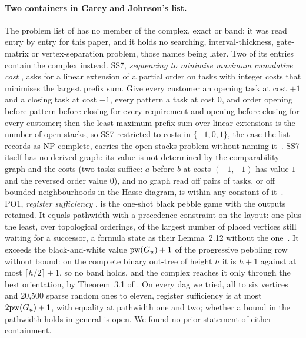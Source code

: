 \paragraph{Two containers in Garey and Johnson's list.} The problem list of
\citet{GareyJohnson1979} has no member of the complex, exact or band: it was
read entry by entry for this paper, and it holds no searching,
interval-thickness, gate-matrix or vertex-separation problem, those names
being later. Two of its entries contain the complex instead. SS7,
\emph{sequencing to minimise maximum cumulative cost}
\citep{AbdelWahab1976}, asks for a linear extension of a partial order on
tasks with integer costs that minimises the largest prefix sum. Give every
customer an opening task at cost $+1$ and a closing task at cost $-1$, every
pattern a task at cost $0$, and order opening before pattern before closing
for every requirement and opening before closing for every customer; then the
least maximum prefix sum over linear extensions is the number of open stacks,
so SS7 restricted to costs in $\{-1,0,1\}$, the case the list records as
NP-complete, carries the open-stacks problem without naming
it~. SS7 itself has no derived graph: its value is not
determined by the comparability graph and the costs (two tasks suffice: $a$
before $b$ at costs $(+1,-1)$ has value $1$ and the reversed order value
$0$), and no graph read off pairs of tasks, or off bounded neighbourhoods in
the Hasse diagram, is within any constant of it~. PO1,
\emph{register sufficiency} \citep{Sethi1975}, is the one-shot black pebble
game with the outputs retained. It equals pathwidth with a precedence
constraint on the layout: one plus the least, over topological orderings, of
the largest number of placed vertices still waiting for a successor, a
formula \citet{AustrinPitassiWu2011} state as their Lemma~2.12 without the
one~. It exceeds the black-and-white value $\mathrm{pw}(G_u)+1$
of the progressive pebbling row without bound: on the complete binary
out-tree of height $h$ it is $h+1$ against at most $\lceil h/2\rceil+1$, so
no band holds, and the complex reaches it only through the best orientation,
by Theorem~3.1 of \citet{LY2002ref10}. On every dag we tried, all to six
vertices and 20,500 sparse random ones to eleven, register sufficiency is at
most $2\mathrm{pw}(G_u)+1$, with equality at pathwidth one and two; whether a bound
in the pathwidth holds in general is open. We found no prior statement of
either containment.
